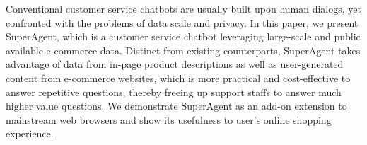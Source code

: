 Conventional customer service chatbots are usually built upon human dialogs, yet confronted with the problems of data scale and privacy. In this paper, we present SuperAgent, which is a customer service chatbot leveraging large-scale and public available e-commerce data. Distinct from existing counterparts, SuperAgent takes advantage of data from in-page product descriptions as well as user-generated content from e-commerce websites, which is more practical and cost-effective to answer repetitive questions, thereby freeing up support staffs to answer much higher value questions. We demonstrate SuperAgent as an add-on extension to mainstream web browsers and show its usefulness to user's online shopping experience.

